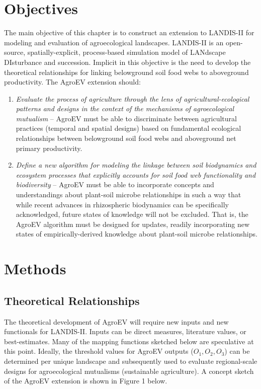 \section{Objectives}
The main objective of this chapter is to construct an extension to LANDIS-II for modeling and evaluation of agroecological landscapes. LANDIS-II is an open-source, spatially-explicit, process-based simulation model of LANdscape DIsturbance and succession. Implicit in this objective is the need to develop the theoretical relationships for linking belowground soil food webs to aboveground productivity.
The AgroEV extension should:
\begin{enumerate}
  \item \textit{Evaluate the process of agriculture through the lens of agricultural-ecological patterns and designs in the context of the mechanisms of agroecological mutualism} -- AgroEV must be able to discriminate between agricultural practices (temporal and spatial designs) based on fundamental ecological relationships between belowground soil food webs and aboveground net primary productivity. 
  \item \textit{Define a new algorithm for modeling the linkage between soil biodynamics and ecosystem processes that explicitly accounts for soil food web functionality and biodiversity} -- AgroEV must be able to incorporate concepts and understandings about plant-soil microbe relationships in such a way that while recent advances in rhizospheric biodynamics can be specifically acknowledged, future states of knowledge will not be excluded. That is, the AgroEV algorithm must be designed for updates, readily incorporating new states of empirically-derived knowledge about plant-soil microbe relationships.
\end{enumerate}



\section{Methods}

\subsection{Theoretical Relationships}
The theoretical development of AgroEV will require new inputs and new functionals for LANDIS-II.  Inputs can be direct measures, literature values, or best-estimates. Many of the mapping functions sketched below are speculative at this point. Ideally, the threshold values for AgroEV outputs ($ O_1, O_2, O_3$) can be determined per unique landscape and subsequently used to evaluate regional-scale designs for agroecological mutualisms (sustainable agriculture). A concept sketch of the AgroEV extension is shown in Figure 1 below.\\

